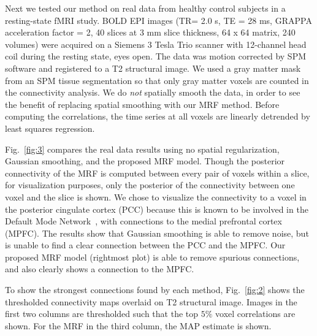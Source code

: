 \documentclass[runningheads,a4paper]{llncs}
\begin{document}

 Next we tested our method on real data from
healthy control subjects in a resting-state fMRI study. BOLD EPI images (TR= 2.0
s, TE = 28 ms, GRAPPA acceleration factor = 2, 40 slices at 3 mm slice
thickness, 64 x 64 matrix, 240 volumes) were acquired on a Siemens 3 Tesla Trio
scanner with 12-channel head coil during the resting state, eyes open. The data
was motion corrected by SPM software and registered to a T2 structural image. We
used a gray matter mask from an SPM tissue segmentation so that only gray matter
voxels are counted in the connectivity analysis. We do \emph{not} spatially
smooth the data, in order to see the benefit of replacing spatial smoothing with
our MRF method. Before computing the correlations, the time series at all voxels
are linearly detrended by least squares regression.

Fig.~\ref{fig:3} compares the real data results using no spatial regularization,
Gaussian smoothing, and the proposed MRF model. Though the posterior
connectivity of the MRF is computed between every pair of voxels within a slice,
for visualization purposes, only the posterior of the connectivity between one
voxel and the slice is shown. We chose to visualize the connectivity to a voxel
in the posterior cingulate cortex (PCC) because this is known to be involved in
the Default Mode Network~\cite{raichle2001}, with connections to the medial
prefrontal cortex (MPFC). The results show that Gaussian smoothing is able to
remove noise, but is unable to find a clear connection between the PCC and the
MPFC. Our proposed MRF model (rightmost plot) is able to remove spurious
connections, and also clearly shows a connection to the MPFC.

To show the strongest connections found by each method,
Fig.~\ref{fig:2} shows the thresholded connectivity maps overlaid on T2
structural image. Images in the first two columns are thresholded such that the
top $5\%$ voxel correlations are shown. For the MRF in the third column, the MAP
estimate is shown.
\end{document}
